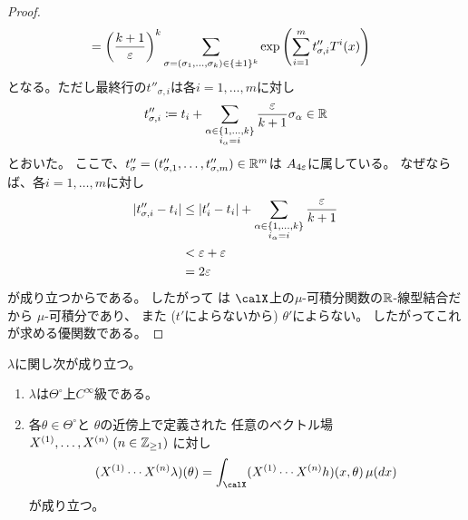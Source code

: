 \documentclass[report]{jlreq}
\begin{document}
\begin{proof}
\begin{alignat}{1}
            &=
                \myparen{
                    \frac{k + 1}{\eps}
                }^k
                \sum_{\sigma = (\sigma_1, \dots, \sigma_k) \in \{ \pm 1 \}^k}
                    \exp\myparen{
                        \sum_{i = 1}^m
                            t''_{\sigma, i} T^i(x)
                    }
                \locallabel{eq:estimate-2}
    \end{alignat}
    となる。ただし最終行の$t''_{\sigma, i}$は各$i = 1, \dots, m$に対し
    \begin{equation}
        t''_{\sigma, i} \coloneqq
            t_i + \sum_{\substack{
                \alpha \in \{ 1, \dots, k \} \\
                i_\alpha = i
            }}
                \frac{\varepsilon}{k + 1}
                \sigma_\alpha
            \in \mathbb{R}
    \end{equation}
    とおいた。
    ここで、$t''_\sigma = (t''_{\sigma, 1}, \dots, t''_{\sigma, m}) \in \mathbb{R}^m$は
    $A_{4\varepsilon}$に属している。
    なぜならば、各$i = 1, \dots, m$に対し
    \begin{alignat}{1}
        |t''_{\sigma, i} - t_i|
            &\le |t'_i - t_i| + \sum_{\substack{
                \alpha \in \{ 1, \dots, k \} \\
                i_\alpha = i
            }}
                \frac{\varepsilon}{k + 1} \\
            &< \varepsilon + \varepsilon \\
            &= 2\varepsilon
    \end{alignat}
    が成り立つからである。
    したがって
    は
    $\calX$上の$\mu$-可積分関数の$\mathbb{R}$-線型結合だから
    $\mu$-可積分であり、
    また ($t'$によらないから) $\theta'$によらない。
    したがってこれが求める優関数である。
\end{proof}

\begin{theorem}[積分記号下の微分]
    $\lambda$に関し次が成り立つ。
    \begin{enumerate}
        \item $\lambda$は$\Theta^\circ$上$C^\infty$級である。
        \item 各$\theta \in \Theta^\circ$と
            $\theta$の近傍上で定義された
            任意のベクトル場$X^{(1)}, \dots, X^{(n)} \; (n \in \mathbb{Z}_{\ge 1})$
            に対し
            \begin{equation}
                (X^{(1)} \cdots X^{(n)} \lambda)(\theta)
                    = \int_\calX
                        (X^{(1)} \cdots X^{(n)} h)(x, \theta) \, \mu(dx)
            \end{equation}
            が成り立つ。
    \end{enumerate}
\end{theorem}
\end{document}
